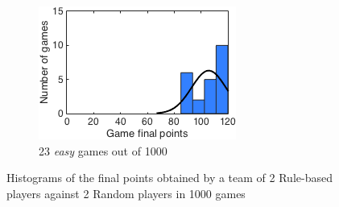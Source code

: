 \begin{figure}[h]
\begin{subfigure}[h]{0.32\textwidth}
                \includegraphics[width=\textwidth]{./img/appendix/histCeasy}
                \caption{23 \emph{easy} games out of 1000}
                \label{app:histCeasy}
        \end{subfigure}
        \caption[Histograms of the final points obtained in scenario (c) for \emph{hard}, \emph{medium} and \emph{easy} hands]{Histograms of the final points obtained by a team of 2 Rule-based players against 2 Random players in 1000 games}
        \label{app:histogramsC}
\end{figure}

